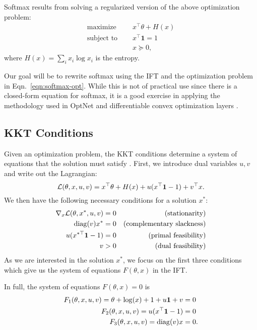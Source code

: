 \documentclass[11pt]{article}
\begin{document}
Softmax results from solving a regularized version of the above optimization problem:
\begin{equation}
\label{eqn:softmax-opt}
\begin{aligned}
\textrm{maximize } \quad & x^\top\theta + H(x)\\
\textrm{subject to } \quad & x^\top \mathbf{1} = 1\\
& x \succeq 0,
\end{aligned}
\end{equation}
where $H(x) = \sum_i x_i \log x_i$ is the entropy.

Our goal will be to rewrite softmax using the IFT and the optimization problem in
Eqn.~\ref{eqn:softmax-opt}.
While this is not of practical use since there is a closed-form equation
for softmax, it is a good exercise in applying the methodology
used in OptNet and differentiable convex optimization layers \citep{optnet,agrawal2019diffcvx}.

\subsection{KKT Conditions}
Given an optimization problem, the KKT conditions determine a system of equations
that the solution must satisfy \citep{kkt-thesis,kkt}.
First, we introduce dual variables $u,v$ and write out the Lagrangian:
$$\mathcal{L}(\theta, x, u, v) = x^\top\theta + H(x) + u(x^\top \mathbf{1} - 1) + v^\top x.$$
We then have the following necessary conditions for a solution $x^*$:
\begin{equation}
\begin{aligned}
\nabla_x \mathcal{L}(\theta, x^*,u,v) = 0 && \textrm{(stationarity)}\\
\mathrm{diag}(v)x^* = 0 && \textrm{(complementary slackness)}\\
u(x^{*\top} \mathbf{1} - 1) = 0 && \textrm{(primal feasibility)}\\
v > 0 && \textrm{(dual feasibility)}
\end{aligned}
\end{equation}
As we are interested in the solution $x^*$, we focus on the first three conditions
which give us the system of equations $F(\theta, x)$ in the IFT.

In full, the system of equations $F(\theta, x) = 0$ is
\begin{equation}
\label{eqn:system}
\begin{aligned}
F_1(\theta,x,u,v) = \theta + \log(x) + 1 + u\mathbf{1} + v &= 0\\
F_2(\theta,x,u,v) = u(x^{\top} \mathbf{1} - 1) &= 0\\
F_3(\theta,x,u,v) = \mathrm{diag}(v)x &= 0.
\end{aligned}
\end{equation}
\end{document}
